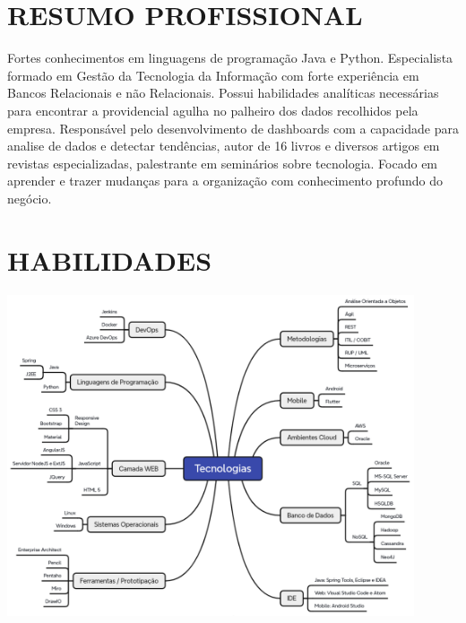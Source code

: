\documentclass{res}
\begin{document}
	
	\thispagestyle{empty} %
	\address{{\bf Brasil - DF - Brasília} -- Asa Norte -- 70757-120 \\
		Tel. (61) 99874.0763 -- Tel.Recado (61) 3201.5834 \\
	    fernando.anselmo74@gmail.com}
	
	\begin{resume}
		
		\section{RESUMO PROFISSIONAL}
		\vspace{8pt}
		Fortes conhecimentos em linguagens de programação Java e Python. Especialista formado em Gestão da Tecnologia da Informação com forte experiência em Bancos Relacionais e não Relacionais. Possui habilidades analíticas necessárias para encontrar a providencial agulha no palheiro dos dados recolhidos pela empresa. Responsável pelo desenvolvimento de dashboards com a capacidade para analise de dados e detectar tendências, autor de 16 livros e diversos artigos em revistas especializadas, palestrante em seminários sobre tecnologia. Focado em aprender e trazer mudanças para a organização com conhecimento profundo do negócio.
		
		\section{HABILIDADES}
		\vspace{8pt}
		\includegraphics[width=0.9\textwidth]{imagens/tecnologias.png}
		

\end{resume}
\end{document}
